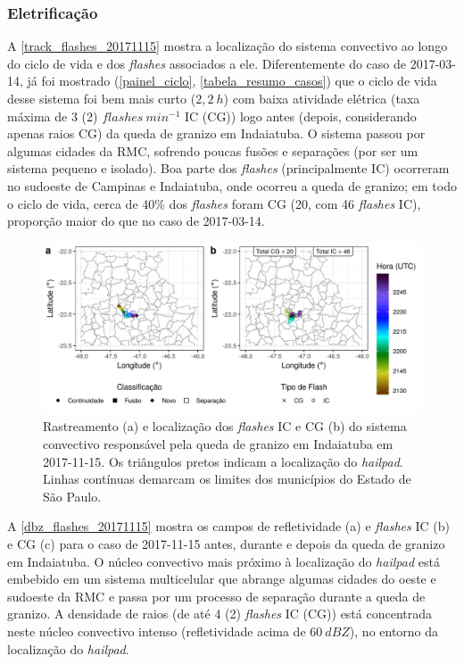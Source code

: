 \subsubsection{Eletrificação}\label{elec_20171115}

A \autoref{track_flashes_20171115} mostra a localização do sistema convectivo ao longo do ciclo de vida e dos \textit{flashes} associados a ele. Diferentemente do caso de 2017-03-14, já foi mostrado (\autoref{painel_ciclo}, \autoref{tabela_resumo_casos}) que o ciclo de vida desse sistema foi bem mais curto ($2,2\:h$) com baixa atividade elétrica (taxa máxima de 3 (2) $flashes\:min^{-1}$ IC (CG)) logo antes (depois, considerando apenas raios CG) da queda de granizo em Indaiatuba. O sistema passou por algumas cidades da RMC, sofrendo poucas fusões e separações (por ser um sistema pequeno e isolado). Boa parte dos \textit{flashes} (principalmente IC) ocorreram no sudoeste de Campinas e Indaiatuba, onde ocorreu a queda de granizo; em todo o ciclo de vida, cerca de 40\% dos \textit{flashes} foram CG (20, com 46 \textit{flashes} IC), proporção maior do que no caso de 2017-03-14.

\begin{figure}[htb]
	\begin{center}
		\caption{Rastreamento (a) e localização dos \textit{flashes} IC e CG (b) do sistema convectivo responsável pela queda de granizo em Indaiatuba em 2017-11-15. Os triângulos pretos indicam a localização do \textit{hailpad}. Linhas contínuas demarcam os limites dos municípios do Estado de São Paulo.} 
		\label{track_flashes_20171115}
		\includegraphics[width=\columnwidth]{../General_Processing/figures/track_flashes_20171115_ptbr.png}
	\end{center}
\end{figure}

A \autoref{dbz_flashes_20171115} mostra os campos de refletividade (a) e \textit{flashes} IC (b) e CG (c) para o caso de 2017-11-15 antes, durante e depois da queda de granizo em Indaiatuba. O núcleo convectivo mais próximo à localização do \textit{hailpad} está embebido em um sistema multicelular que abrange algumas cidades do oeste e sudoeste da RMC e passa por um processo de separação durante a queda de granizo. A densidade de raios (de até 4 (2) \textit{flashes} IC (CG)) está concentrada neste núcleo convectivo intenso (refletividade acima de $60\:dBZ$), no entorno da localização do \textit{hailpad}.


